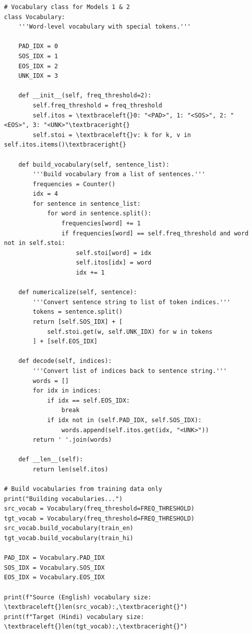 \documentclass[12pt,a4paper,oneside]{report}
\begin{document}
\begin{Verbatim}[commandchars=\\\{\},breaklines=true,breakanywhere=true,fontsize=\scriptsize,frame=leftline,framesep=2mm,rulecolor=\color{gray}]
# Vocabulary class for Models 1 & 2
class Vocabulary:
    '''Word-level vocabulary with special tokens.'''

    PAD_IDX = 0
    SOS_IDX = 1
    EOS_IDX = 2
    UNK_IDX = 3

    def __init__(self, freq_threshold=2):
        self.freq_threshold = freq_threshold
        self.itos = \textbraceleft{}0: "<PAD>", 1: "<SOS>", 2: "<EOS>", 3: "<UNK>"\textbraceright{}
        self.stoi = \textbraceleft{}v: k for k, v in self.itos.items()\textbraceright{}

    def build_vocabulary(self, sentence_list):
        '''Build vocabulary from a list of sentences.'''
        frequencies = Counter()
        idx = 4
        for sentence in sentence_list:
            for word in sentence.split():
                frequencies[word] += 1
                if frequencies[word] == self.freq_threshold and word not in self.stoi:
                    self.stoi[word] = idx
                    self.itos[idx] = word
                    idx += 1

    def numericalize(self, sentence):
        '''Convert sentence string to list of token indices.'''
        tokens = sentence.split()
        return [self.SOS_IDX] + [
            self.stoi.get(w, self.UNK_IDX) for w in tokens
        ] + [self.EOS_IDX]

    def decode(self, indices):
        '''Convert list of indices back to sentence string.'''
        words = []
        for idx in indices:
            if idx == self.EOS_IDX:
                break
            if idx not in (self.PAD_IDX, self.SOS_IDX):
                words.append(self.itos.get(idx, "<UNK>"))
        return ' '.join(words)

    def __len__(self):
        return len(self.itos)

# Build vocabularies from training data only
print("Building vocabularies...")
src_vocab = Vocabulary(freq_threshold=FREQ_THRESHOLD)
tgt_vocab = Vocabulary(freq_threshold=FREQ_THRESHOLD)
src_vocab.build_vocabulary(train_en)
tgt_vocab.build_vocabulary(train_hi)

PAD_IDX = Vocabulary.PAD_IDX
SOS_IDX = Vocabulary.SOS_IDX
EOS_IDX = Vocabulary.EOS_IDX

print(f"Source (English) vocabulary size: \textbraceleft{}len(src_vocab):,\textbraceright{}")
print(f"Target (Hindi) vocabulary size: \textbraceleft{}len(tgt_vocab):,\textbraceright{}")
\end{Verbatim}
\end{document}
